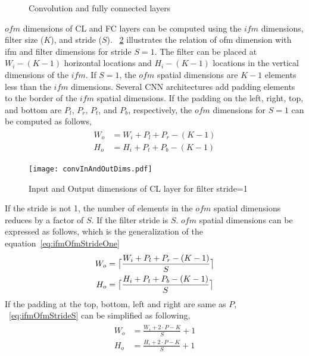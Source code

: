 \begin{figure}[!htb]
	\centering
	\captionsetup{font=sf}	
	\hfil	
	\hfil	
	\caption{Convolution and fully connected layers}
	\label{fig:CNNAcceleratorAndCLOps}
\end{figure}

$ofm$ dimensions of CL and FC layers can be computed using the $ifm$ dimensions, filter size ($K$), and stride ($S$). \figurename{~\ref{fig:CLInOutDimRel}} illustrates the relation of ofm dimension with ifm and filter dimensions for stride $S{=}1$. The filter can be placed at $W_i{-}(K{-}1)$ horizontal locations and $H_i{-}(K{-}1)$ locations in the vertical dimensions of the $ifm$. If $S{=}1$, the $ofm$ spatial dimensions are $K{-}1$ elements less than the $ifm$ dimensions. Several CNN architectures add padding elements to the border of the $ifm$ spatial dimensions. If the padding on the left, right, top, and bottom are $P_l$, $P_r$, $P_t$, and $P_b$, respectively, the $ofm$ dimensions for $S{=}1$ can be computed as follows,
\begin{align}\label{eq:ifmOfmStrideOne}
	\begin{split}
W_o&=W_i+P_l+P_r-(K-1)\\
H_o&=H_i+P_t+P_b-(K-1)
\end{split}
\end{align}
\begin{figure}[!htb]
	\centering
	\captionsetup{font=sf}	
	{\texttt{[image: convInAndOutDims.pdf]}
		\label{fig:CLInOutRelHz}}
	\caption{Input and Output dimensions of CL layer for filter stride=1  }
	\label{fig:CLInOutDimRel}
\end{figure}
If the stride is not 1, the number of elements in the $ofm$ spatial dimensions reduces by a factor of $S$. If the filter stride is $S$. $ofm$ spatial dimensions can be expressed as follows, which is the generalization of the equation~\eqref{eq:ifmOfmStrideOne}
\begin{align}\label{eq:ifmOfmStrideS}
	\begin{split}
		W_o&=\ceil[\big]{\frac{W_i+P_l+P_r-(K-1)}{S}}\\
		H_o&=\ceil[\big]{\frac{H_i+P_t+P_b-(K-1)}{S}}
	\end{split}
\end{align}
If the padding at the top, bottom, left and right are same as $P$, ~\eqref{eq:ifmOfmStrideS} can be simplified as following,
\begin{align}\label{eq:ifmOfmStrideS_P}
	\begin{split}
		W_o&={\frac{W_i+2\cdot P-K}{S}}{+}1\\
		H_o&={\frac{H_i+2\cdot P-K}{S}{+}1}
	\end{split}
\end{align}

